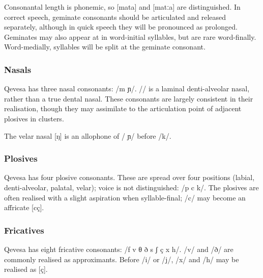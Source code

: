 \documentclass[grammar]{subfiles}
\begin{document}
Consonantal length is phonemic, so [mata] and [matːa] are distinguished.  In
correct speech, geminate consonants should be articulated and released
separately, although in quick speech they will be pronounced as prolonged.
Geminates may also appear at in word-initial syllables, but are rare
word-finally.  Word-medially, syllables will be split at the geminate
consonant.

\subsubsection{Nasals}
\label{sssec:nasals}

Qevesa has three nasal consonants: /m  ɲ/.  // is a laminal
denti-alveolar nasal, rather than a true dental nasal.  These consonants are
largely consistent in their realisation, though they may assimilate to the
articulation point of adjacent plosives in clusters. 

The velar nasal [ŋ] is an allophone of / ɲ/ before /k/.

\subsubsection{Plosives}
\label{sssec:plosives}

Qevesa has four plosive consonants.  These are spread over four positions
(labial, denti-alveolar, palatal, velar); voice is not distinguished: /p
 c k/.  The plosives are often realised with a slight aspiration when
syllable-final; /c/ may become an affricate [cç].  


\subsubsection{Fricatives}
\label{sssec:fricatives}

Qevesa has eight fricative consonants: /f v θ ð s ʃ ç x h/.  /v/ and /ð/ are
commonly realised as approximants.  Before /i/ or /j/, /x/ and /h/ may be
realised as [ç].
% 
\end{document}

